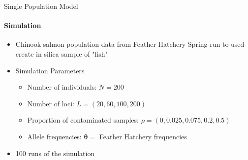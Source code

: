 \documentclass[letter,graphicx]{beamer}
\begin{document}
\begin{frame}{Single Population Model}
\framesubtitle{Simulation}
\begin{itemize}
\item Chinook salmon population data from Feather Hatchery Spring-run to used create in silica sample of "fish"
\vspace{3mm}
\item Simulation Parameters
	\begin{itemize}
	\item Number of individuals: $N = 200$
	\vspace{1.5mm}
	\item Number of loci: $L =  (20, 60, 100, 200)$
	\vspace{1.5mm}
	\item Proportion of contaminated samples: $\rho = (0, 0.025, 0.075, 0.2, 0.5)$
	\vspace{1.5mm}
	\item Allele frequencies: $\boldsymbol{\theta} =$ Feather Hatchery frequencies 
	\end{itemize}
	\vspace{3mm}
\item 100 runs of the simulation
\end{itemize}
\end{frame}
\end{document}
